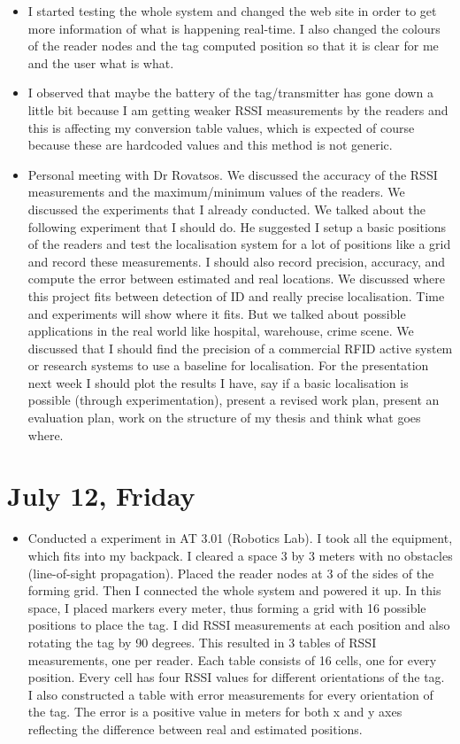 \documentclass[a4paper,12pt]{article}
\begin{document}
\begin{itemize}
	\item I started testing the whole system and changed the web site in order to get more information of what is happening real-time. I also changed the colours of the reader nodes and the tag computed position so that it is clear for me and the user what is what.
	\item I observed that maybe the battery of the tag/transmitter has gone down a little bit because I am getting weaker RSSI measurements by the readers and this is affecting my conversion table values, which is expected of course because these are hardcoded values and this method is not generic.
	\item Personal meeting with Dr Rovatsos. We discussed the accuracy of the RSSI measurements and the maximum/minimum values of the readers. We discussed the experiments that I already conducted. We talked about the following experiment that I should do. He suggested I setup a basic positions of the readers and test the localisation system for a lot of positions like a grid and record these measurements. I should also record precision, accuracy, and compute the error between estimated and real locations. We discussed where this project fits between detection of ID and really precise localisation. Time and experiments will show where it fits. But we talked about possible applications in the real world like hospital, warehouse, crime scene. We discussed that I should find the precision of a commercial RFID active system or research systems to use a baseline for localisation. For the presentation next week I should plot the results I have, say if a basic localisation is possible (through experimentation), present a revised work plan, present an evaluation plan, work on the structure of my thesis and think what goes where.
\end{itemize}

\section{July 12, Friday}
\begin{itemize}
	\item Conducted a experiment in AT 3.01 (Robotics Lab). I took all the equipment, which fits into my backpack. I cleared a space 3 by 3 meters with no obstacles (line-of-sight propagation). Placed the reader nodes at 3 of the sides of the forming grid. Then I connected the whole system and powered it up. In this space, I placed markers every meter, thus forming a grid with 16 possible positions to place the tag. I did RSSI measurements at each position and also rotating the tag by 90 degrees. This resulted in 3 tables of RSSI measurements, one per reader. Each table consists of 16 cells, one for every position. Every cell has four RSSI values for different orientations of the tag. I also constructed a table with error measurements for every orientation of the tag. The error is a positive value in meters for both x and y axes reflecting the difference between real and estimated positions. 
\end{itemize}
\end{document}
